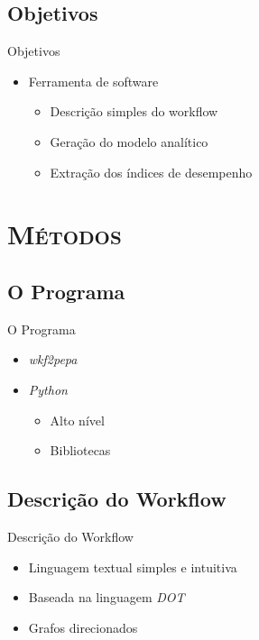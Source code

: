 \documentclass[xcolor=x11names,compress]{beamer}
\renewcommand{\(}{\begin{columns}}
\renewcommand{\)}{\end{columns}}
\newcommand{\<}[1]{\begin{column}{#1}}
\renewcommand{\>}{\end{column}}
\begin{document}
    \subsection{Objetivos}
        \begin{frame}{Objetivos}
            \begin{itemize}[<+->]
                \item Ferramenta de software
                    \begin{itemize}
                        \item Descrição simples do workflow
                        \item Geração do modelo analítico
                        \item Extração dos índices de desempenho
                    \end{itemize}
            \end{itemize}
        \end{frame}

\section{\scshape Métodos}

    \subsection{O Programa}
        \begin{frame}{O Programa}
            \begin{itemize}
                \item<1-> \emph{wkf2pepa}
                \item<2-> \emph{Python}
                    \begin{itemize}
                        \item<3-> Alto nível
                        \item<3-> Bibliotecas
                    \end{itemize}
            \end{itemize}
        \end{frame}

    \subsection{Descrição do Workflow}
        \begin{frame}{Descrição do Workflow}
            \begin{itemize}[<+->]
                \item Linguagem textual simples e intuitiva
                \item Baseada na linguagem \emph{DOT}
                \item Grafos direcionados
            \end{itemize}
        \end{frame}
\end{document}
